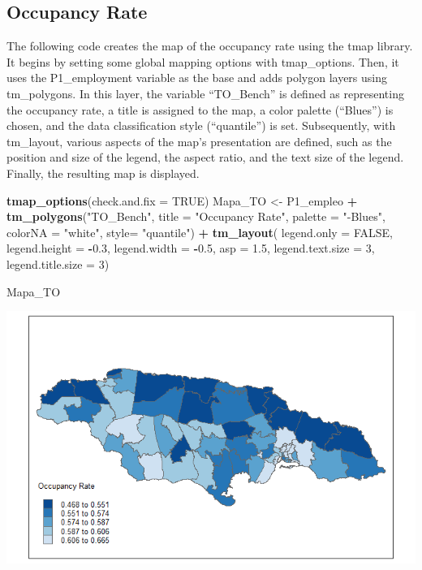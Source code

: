 \documentclass[
  12pt,
]{book}
\newenvironment{Shaded}{\begin{snugshade}}{\end{snugshade}}
\newcommand{\AttributeTok}[1]{\textcolor[rgb]{0.13,0.29,0.53}{#1}}
\newcommand{\ConstantTok}[1]{\textcolor[rgb]{0.56,0.35,0.01}{#1}}
\newcommand{\DecValTok}[1]{\textcolor[rgb]{0.00,0.00,0.81}{#1}}
\newcommand{\FloatTok}[1]{\textcolor[rgb]{0.00,0.00,0.81}{#1}}
\newcommand{\FunctionTok}[1]{\textcolor[rgb]{0.13,0.29,0.53}{\textbf{#1}}}
\newcommand{\NormalTok}[1]{#1}
\newcommand{\OtherTok}[1]{\textcolor[rgb]{0.56,0.35,0.01}{#1}}
\newcommand{\SpecialCharTok}[1]{\textcolor[rgb]{0.81,0.36,0.00}{\textbf{#1}}}
\newcommand{\StringTok}[1]{\textcolor[rgb]{0.31,0.60,0.02}{#1}}
\begin{document}
\hypertarget{occupancy-rate-1}{%
\subsection*{Occupancy Rate}\label{occupancy-rate-1}}

The following code creates the map of the occupancy rate using the tmap library. It begins by setting some global mapping options with tmap\_options. Then, it uses the P1\_employment variable as the base and adds polygon layers using tm\_polygons. In this layer, the variable ``TO\_Bench'' is defined as representing the occupancy rate, a title is assigned to the map, a color palette (``Blues'') is chosen, and the data classification style (``quantile'') is set. Subsequently, with tm\_layout, various aspects of the map's presentation are defined, such as the position and size of the legend, the aspect ratio, and the text size of the legend. Finally, the resulting map is displayed.

\begin{Shaded}
\begin{Highlighting}[]
\FunctionTok{tmap\_options}\NormalTok{(}\AttributeTok{check.and.fix =} \ConstantTok{TRUE}\NormalTok{)}
\NormalTok{Mapa\_TO }\OtherTok{\textless{}{-}}
\NormalTok{  P1\_empleo }\SpecialCharTok{+}
  \FunctionTok{tm\_polygons}\NormalTok{(}\StringTok{"TO\_Bench"}\NormalTok{,}
          \AttributeTok{title =} \StringTok{"Occupancy Rate"}\NormalTok{,}
          \AttributeTok{palette =} \StringTok{"{-}Blues"}\NormalTok{,}
          \AttributeTok{colorNA =} \StringTok{"white"}\NormalTok{,}
          \AttributeTok{style=} \StringTok{"quantile"}\NormalTok{) }\SpecialCharTok{+}
  \FunctionTok{tm\_layout}\NormalTok{( }
    \AttributeTok{legend.only =} \ConstantTok{FALSE}\NormalTok{,}
    \AttributeTok{legend.height =} \SpecialCharTok{{-}}\FloatTok{0.3}\NormalTok{,}
    \AttributeTok{legend.width =} \SpecialCharTok{{-}}\FloatTok{0.5}\NormalTok{,}
    \AttributeTok{asp =} \FloatTok{1.5}\NormalTok{,}
    \AttributeTok{legend.text.size =} \DecValTok{3}\NormalTok{,}
    \AttributeTok{legend.title.size =} \DecValTok{3}\NormalTok{)}

\NormalTok{Mapa\_TO}
\end{Highlighting}
\end{Shaded}

\includegraphics{Recursos/05_Empleo/17_map_TO.png}
\end{document}
